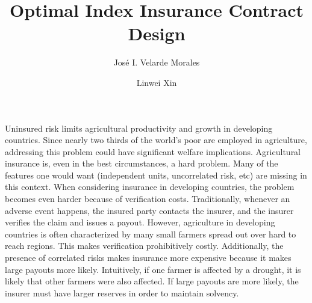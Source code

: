 \documentclass[11pt]{article}
\title{Optimal Index Insurance Contract Design}
\author{José I. Velarde Morales}
\author{Linwei Xin}
\affil{University of Chicago - Booth School of Business}
\begin{document}
\maketitle

Uninsured risk limits agricultural productivity and growth in developing countries. Since nearly two thirds of the world's poor are employed in agriculture, addressing this problem could have significant welfare implications. Agricultural insurance is, even in the best circumstances, a hard problem. Many of the features one would want (independent units, uncorrelated risk, etc) are missing in this context. When considering insurance in developing countries, the problem becomes even harder because of verification costs. Traditionally, whenever an adverse event happens, the insured party contacts the insurer, and the insurer verifies the claim and issues a payout. However, agriculture in developing countries is often characterized by many small farmers spread out over hard to reach regions. This makes verification prohibitively costly. Additionally, the presence of correlated risks makes insurance more expensive because it makes large payouts more likely. Intuitively, if one farmer is affected by a drought, it is likely that other farmers were also affected. If large payouts are more likely, the insurer must have larger reserves in order to maintain solvency. 
\end{document}
